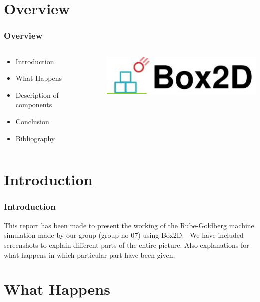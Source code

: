 

\section{Overview}

\begin{frame}
\frametitle{Overview}
\begin{columns}
\begin{column}{.5\textwidth}
\begin{itemize}
\item Introduction
\item What Happens
\item Description of components
\item Conclusion
\item Bibliography
\end{itemize}
\end{column}
\begin{column}{.5\textwidth}
\includegraphics[width=.7\textwidth]{Box2d}
\end{column}
\end{columns}
\end{frame}


\section{Introduction}

\begin{frame}
\frametitle{Introduction}
This report has been made to present the working of the Rube-Goldberg machine simulation made by our group (group no 07) using Box2D. \
We have included screenshots to explain different parts of the entire picture. Also explanations for what happens in which particular part have been given.
\end{frame}

\section{What Happens}

